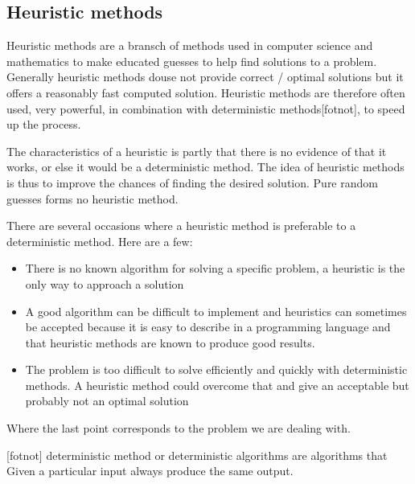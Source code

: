 \subsection{Heuristic methods}

Heuristic methods are a bransch of methods used in computer science and mathematics to make educated guesses to help find solutions to a problem. Generally heuristic methods douse not provide correct / optimal solutions but it offers a reasonably fast computed solution. Heuristic methods are therefore often used, very powerful, in combination with deterministic methods[fotnot], to speed up the process.

The characteristics of a heuristic is partly that there is no evidence of that it works, or else it would be a deterministic method. The idea of heuristic methods is thus to improve the chances of finding the desired solution. Pure random guesses forms no heuristic method.

There are several occasions where a heuristic method is preferable to a deterministic method.
Here are a few:

\begin{itemize}
\item There is no known algorithm for solving a specific problem, a heuristic is the only way to approach a solution
\item A good algorithm can be difficult to implement and heuristics can sometimes be accepted because it is easy to describe in a programming language and that heuristic methods are known to produce good results.
\item The problem is too difficult to solve efficiently and quickly with deterministic methods. A heuristic method could overcome that and give an acceptable but probably not an optimal solution
\end{itemize}

Where the last point corresponds to the problem we are dealing with.

[fotnot]
deterministic method  or deterministic algorithms are algorithms that Given a particular input always produce the same output.

